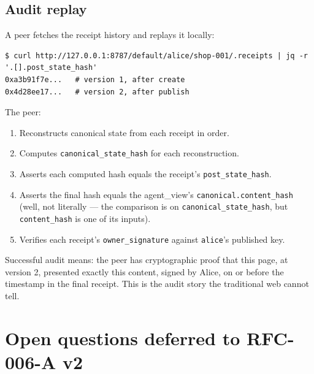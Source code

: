 \documentclass[11pt,a4paper]{article}
\theoremstyle{definition}
\begin{document}
\subsection{Audit replay}

A peer fetches the receipt history and replays it locally:

\begin{lstlisting}
$ curl http://127.0.0.1:8787/default/alice/shop-001/.receipts | jq -r '.[].post_state_hash'
0xa3b91f7e...   # version 1, after create
0x4d28ee17...   # version 2, after publish
\end{lstlisting}

\noindent The peer:
\begin{enumerate}[leftmargin=2em,itemsep=0.15em]
    \item Reconstructs canonical state from each receipt
    in order.
    \item Computes \texttt{canonical\_state\_hash} for each
    reconstruction.
    \item Asserts each computed hash equals the receipt's
    \texttt{post\_state\_hash}.
    \item Asserts the final hash equals the agent\_view's
    \texttt{canonical.content\_hash} (well, not literally ---
    the comparison is on \texttt{canonical\_state\_hash}, but
    \texttt{content\_hash} is one of its inputs).
    \item Verifies each receipt's \texttt{owner\_signature}
    against \texttt{alice}'s published key.
\end{enumerate}

\noindent Successful audit means: the peer has cryptographic
proof that this page, at version 2, presented exactly this
content, signed by Alice, on or before the timestamp in the
final receipt. This is the audit story the traditional web
cannot tell.

\section{Open questions deferred to RFC-006-A v2}
\label{sec:open}
\end{document}
